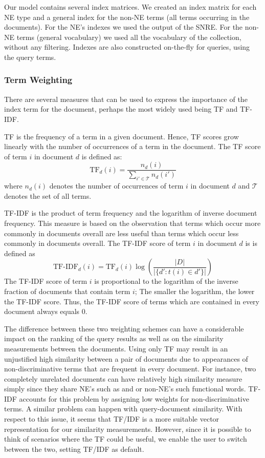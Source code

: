 Our model contains several index matrices. We created an index matrix for each NE type and a general index for the non-NE terms (all terms occurring in the documents). For the NE's indexes we used the output of the SNRE. For the non-NE terms (general vocabulary) we used all the vocabulary of the collection, without any filtering. Indexes are also constructed on-the-fly for queries, using the query terms.

\subsubsection{Term Weighting}
\label{sec:term_weighting}
There are several measures that can be used to express the importance of the index term for the document, perhaps the most widely used being TF and TF-IDF.

TF is the frequency of a term in a given document. Hence, TF scores grow linearly with the number of occurrences of a term in the document. The TF score of term $i$ in document $d$ is defined as:
\[\text{TF}_d(i) = \frac{n_d(i)}{\sum_{i' \in \mathcal{T}}{n_d(i')}}\]
where $n_d(i)$ denotes the number of occurrences of term $i$ in document $d$ and $\mathcal{T}$ denotes the set of all terms. 

TF-IDF is the product of term frequency and the logarithm of inverse document frequency. This measure is based on the observation that terms which occur more commonly in documents overall are less useful than terms which occur less commonly in documents overall. The TF-IDF score of term $i$ in document $d$ is is defined as
\[\text{TF-IDF}_d(i)= \text{TF}_d(i)\log{\left(\frac{|D|}{|\lbrace d' : t(i) \in d' \rbrace|}\right)}\]
The TF-IDF score of term $i$ is proportional to the logarithm of the inverse fraction of documents that contain term $i$; The smaller the logarithm, the lower the TF-IDF score. Thus, the TF-IDF score of terms which are contained in every document always equals $0$.

The difference between these two weighting schemes can have a considerable impact on the ranking of the query results as well as on the similarity measurements between the documents. Using only TF may result in an unjustified high similarity between a pair of documents due to appearances of non-discriminative terms that are frequent in every document. For instance, two completely unrelated documents can have relatively high similarity measure simply since they share NE's such as  and  or non-NE's such functional words. TF-IDF accounts for this problem by assigning low weights for non-discriminative terms. A similar problem can happen with query-document similarity. With respect to this issue, it seems that TF/IDF is a more suitable vector representation for our similarity measurements. However, since it is possible to think of scenarios where the TF could be useful, we enable the user to switch between the two, setting TF/IDF as default. 


